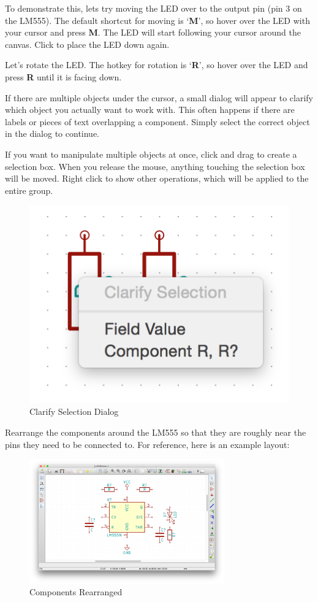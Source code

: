 \documentclass[12pt, oneside]{article}
\begin{document}
To demonstrate this, lets try moving the LED over to the output pin (pin 3 on the LM555). The default shortcut for moving is `\textbf{M}', so hover over the LED with your cursor and press \textbf{M}. The LED will start following your cursor around the canvas. Click to place the LED down again.

Let's rotate the LED. The hotkey for rotation is `\textbf{R}', so hover over the LED and press \textbf{R} until it is facing down.

If there are multiple objects under the cursor, a small dialog will appear to clarify which object you actually want to work with. This often happens if there are labels or pieces of text overlapping a component. Simply select the correct object in the dialog to continue.

If you want to manipulate multiple objects at once, click and drag to create a selection box. When you release the mouse, anything touching the selection box will be moved. Right click to show other operations, which will be applied to the entire group.

\begin{figure}[H]
\includegraphics{ClarifySelection}
\centering
\caption{Clarify Selection Dialog}
\end{figure}

Rearrange the components around the LM555 so that they are roughly near the pins they need to be connected to. For reference, here is an example layout:

\begin{figure}[H]
\includegraphics[width=0.75\textwidth]{RearrangedComponents}
\centering
\caption{Components Rearranged}
\end{figure}
\end{document}
